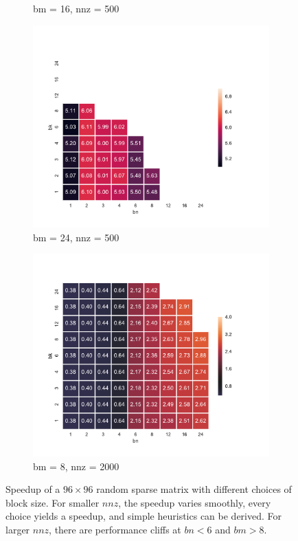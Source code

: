 \begin{figure}[tb]
\begin{subfigure}[b]{0.45\textwidth}
      \caption{bm = 16, nnz = 500}
    \end{subfigure}
    \begin{subfigure}[b]{0.45\textwidth}
      \centering
      \includegraphics[width=\textwidth]{images/unrolled_sizing_500_24.pdf}
      \caption{bm = 24, nnz = 500}
    \end{subfigure}
    \begin{subfigure}[b]{0.45\textwidth}
      \centering
      \includegraphics[width=\textwidth]{images/unrolled_sizing_2000_8.pdf}
      \caption{bm = 8, nnz = 2000}
    \end{subfigure}
    \caption{Speedup of a $96 \times 96$ random sparse matrix with different choices of block size. For smaller $nnz$, the speedup varies smoothly, every choice yields a speedup, and simple heuristics can be derived. For larger $nnz$, there are performance cliffs at $bn < 6$ and $bm > 8$.}
    \label{fig:unrolled_sizing}
  \end{figure}


